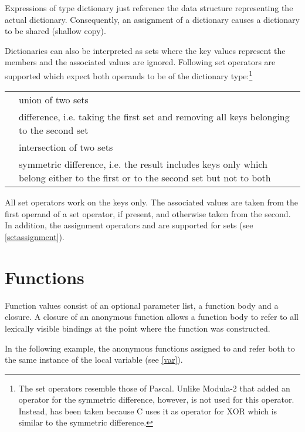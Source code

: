 \noindent
Expressions of type dictionary just reference the data structure
representing the actual dictionary. Consequently, an assignment of a
dictionary causes a dictionary to be shared
(shallow copy).

Dictionaries can also be interpreted as sets\label{sets}
where the key values represent the members and the associated values
are ignored.  Following set operators are supported which expect both
operands to be of the dictionary type:\footnote{The set operators
resemble those of Pascal. Unlike Modula-2 that added an
operator for the symmetric difference, however, \token{/} is
not used for this operator. Instead, \token{\caretSY} has been taken because
C uses it as operator for XOR which is similar to the symmetric
difference.}

\begin{tabular}{l p{4in}}
   \token{+} & union of two sets \\
   \token{$-$} & difference, i.e. taking the first set
      and removing all keys belonging to the second set \\
   \token{$*$} & intersection of two sets \\
   \token{\caretSY} & symmetric difference, i.e. the result
      includes keys only which belong either to the first or
      to the second set but not to both \\
\end{tabular}

\noindent
All set operators work on the keys only.
The associated values are taken from the first operand of a
set operator, if present, and otherwise taken from the second.
In addition, the assignment operators \token{+=} and \token{$-$=}
are supported for sets (see \ref{setassignment}).

\section{Functions}\label{function}

Function values consist of an optional parameter list, a function body
and a closure.
A closure of an anonymous function allows a
function body to refer to all lexically visible bindings at the point
where the function was constructed.

In the following example, the anonymous functions assigned to
 and  refer both to the same instance
of the local variable  (see \ref{var}).

